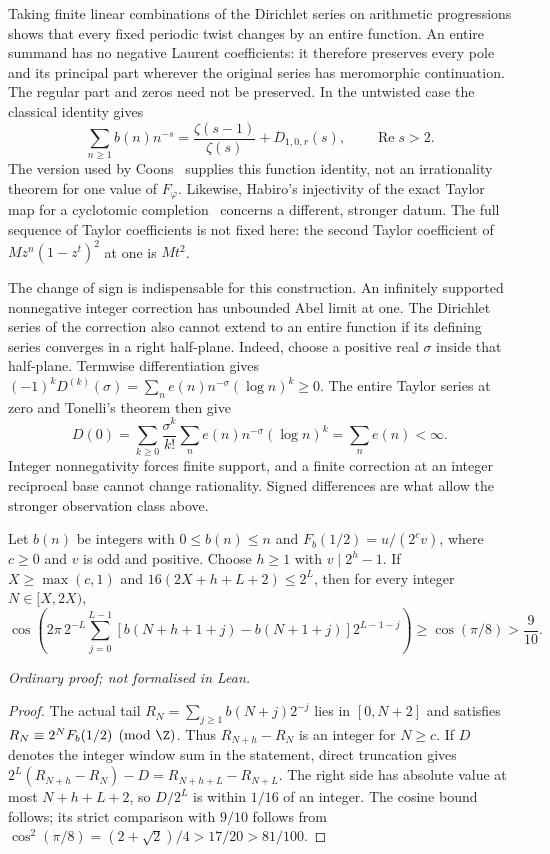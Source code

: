 Taking finite linear combinations of the Dirichlet series on arithmetic
progressions shows that every fixed periodic twist changes by an entire
function. An entire summand has no negative Laurent coefficients: it
therefore preserves every pole and its principal part wherever the
original series has meromorphic continuation. The regular part and
zeros need not be preserved. In the untwisted case the classical identity
gives
\[
 \sum_{n\ge1}b(n)n^{-s}=\frac{\zeta(s-1)}{\zeta(s)}+D_{1,0,r}(s),
 \qquad\operatorname{Re}s>2.
\]
The version used by Coons~\cite[Theorem~3.3]{coons-arxiv-signed} supplies
this function identity, not an irrationality theorem for one value of
$F_\varphi$. Likewise, Habiro's injectivity of the exact Taylor map for
a cyclotomic completion~\cite[Theorem~5.2]{habiro2004signed} concerns a
different, stronger datum. The full sequence of Taylor coefficients is not fixed here:
the second Taylor coefficient of $Mz^n(1-z^t)^2$ at one is $Mt^2$.

The change of sign is indispensable for this construction. An infinitely
supported nonnegative integer correction has unbounded Abel limit at one.
The Dirichlet series of the correction also cannot extend to an
entire function if its defining series converges in a right half-plane. Indeed, choose a positive real
$\sigma$ inside that half-plane. Termwise differentiation gives
$(-1)^kD^{(k)}(\sigma)=\sum_ne(n)n^{-\sigma}(\log n)^k\ge0$.
The entire Taylor series at zero and Tonelli's theorem then give
\[
 D(0)=\sum_{k\ge0}\frac{\sigma^k}{k!}
       \sum_ne(n)n^{-\sigma}(\log n)^k=\sum_ne(n)<\infty.
\]
Integer nonnegativity forces finite support, and a finite correction at
an integer reciprocal base cannot change rationality. Signed differences
are what allow the stronger observation class above.

\begin{rem}
\label{long249:prop:signed-first-harmonic}
Let $b(n)$ be integers with $0\le b(n)\le n$ and
$F_b(1/2)=u/(2^cv)$, where $c\ge0$ and $v$ is odd and positive.
Choose $h\ge1$ with $v\mid2^h-1$. If $X\ge\max(c,1)$ and
$16(2X+h+L+2)\le2^L$, then for every integer $N\in[X,2X)$,
\[
 \cos\left(2\pi\,2^{-L}\sum_{j=0}^{L-1}
    [b(N+h+1+j)-b(N+1+j)]2^{L-1-j}\right)
 \ge\cos(\pi/8)>\frac9{10}.
\]
\end{rem}
\noindent\emph{Ordinary proof; not formalised in Lean.}


\begin{proof}
The actual tail $R_N=\sum_{j\ge1}b(N+j)2^{-j}$ lies in $[0,N+2]$
and satisfies $R_N\equiv2^NF_b(1/2)\pmod\Z$. Thus
$R_{N+h}-R_N$ is an integer for $N\ge c$. If $D$ denotes the integer
window sum in the statement, direct truncation gives
$2^L(R_{N+h}-R_N)-D=R_{N+h+L}-R_{N+L}$.
The right side has absolute value at most $N+h+L+2$, so $D/2^L$ is
within $1/16$ of an integer. The cosine bound follows; its strict
comparison with $9/10$ follows from
$\cos^2(\pi/8)=(2+\sqrt2)/4>17/20>81/100$.
\end{proof}

